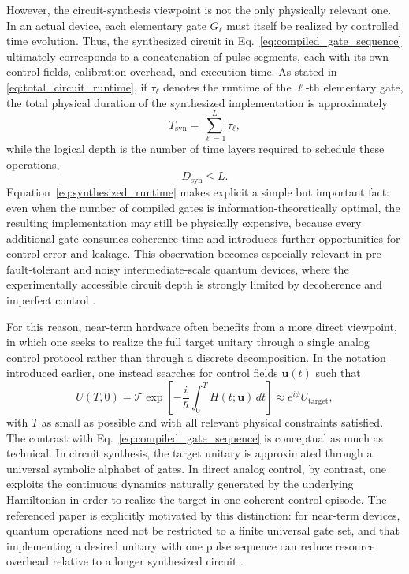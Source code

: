 However, the circuit-synthesis viewpoint is not the only physically relevant one. In an actual device, each elementary gate $G_{\ell}$ must itself be realized by controlled time evolution. Thus, the synthesized circuit in Eq.~\eqref{eq:compiled_gate_sequence} ultimately corresponds to a concatenation of pulse segments, each with its own control fields, calibration overhead, and execution time. 
As stated in \ref{eq:total_circuit_runtime}, if $\tau_{\ell}$ denotes the runtime of the $\ell$-th elementary gate, the total physical duration of the synthesized implementation is approximately
\begin{equation}
T_{\mathrm{syn}}
=
\sum_{\ell=1}^{L} \tau_{\ell},
\label{eq:synthesized_runtime}
\end{equation}
while the logical depth is the number of time layers required to schedule these operations,
\begin{equation}
D_{\mathrm{syn}} \leq L.
\label{eq:logical_depth_definition}
\end{equation}
Equation~\eqref{eq:synthesized_runtime} makes explicit a simple but important fact: even when the number of compiled gates is information-theoretically optimal, the resulting implementation may still be physically expensive, because every additional gate consumes coherence time and introduces further opportunities for control error and leakage. This observation becomes especially relevant in pre-fault-tolerant and noisy intermediate-scale quantum devices, where the experimentally accessible circuit depth is strongly limited by decoherence and imperfect control \cite{Koch2022}.

For this reason, near-term hardware often benefits from a more direct viewpoint, in which one seeks to realize the full target unitary through a single analog control protocol rather than through a discrete decomposition. In the notation introduced earlier, one instead searches for control fields $\bm{u}(t)$ such that
\begin{equation}
U(T,0)
=
\mathcal{T}\exp\!\left[
-\frac{i}{\hbar}\int_{0}^{T} H\!\left(t;\bm{u}\right)\,dt
\right]
\approx
e^{i\phi}U_{\mathrm{target}},
\label{eq:direct_analog_realization}
\end{equation}
with $T$ as small as possible and with all relevant physical constraints satisfied. The contrast with Eq.~\eqref{eq:compiled_gate_sequence} is conceptual as much as technical. In circuit synthesis, the target unitary is approximated through a universal symbolic alphabet of gates. In direct analog control, by contrast, one exploits the continuous dynamics naturally generated by the underlying Hamiltonian in order to realize the target in one coherent control episode. The referenced paper is explicitly motivated by this distinction: for near-term devices, quantum operations need not be restricted to a finite universal gate set, and that implementing a desired unitary with one pulse sequence can reduce resource overhead relative to a longer synthesized circuit \cite{Niu2019}.

